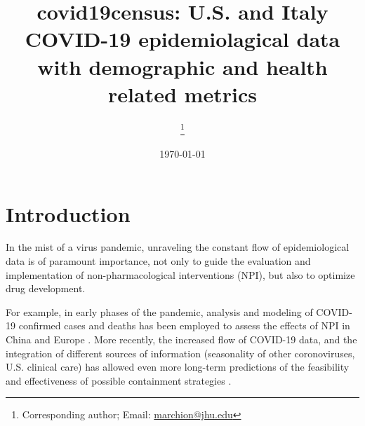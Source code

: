 \documentclass[12pt,halfline,a4paper,]{ouparticle}
\begin{document}
\title{covid19census: U.S. and Italy COVID-19 epidemiolagical data with
demographic and health related metrics}

\author{%
\address{Department of Oncology, Johns Hopkins University School of Medicine,
Baltimore, MD, USA}
\and
{}\address{Department of Oncology, Johns Hopkins University School of Medicine,
Baltimore, MD, USA}\thanks{Corresponding author; Email: \href{mailto:marchion@jhu.edu}{marchion@jhu.edu}}
\and
{}\address{Another University}
}


\date{\today}


\maketitle



\hypertarget{introduction}{%
\section{Introduction}\label{introduction}}

In the mist of a virus pandemic, unraveling the constant flow of
epidemiological data is of paramount importance, not only to guide the
evaluation and implementation of non-pharmacological interventions
(NPI), but also to optimize drug development.

For example, in early phases of the pandemic, analysis and modeling of
COVID-19 confirmed cases and deaths has been employed to assess the
effects of NPI in China and Europe \citep{flaxman2020, prem2020tlph}.
More recently, the increased flow of COVID-19 data, and the integration
of different sources of information (seasonality of other coronoviruses,
U.S. clinical care) has allowed even more long-term predictions of the
feasibility and effectiveness of possible containment strategies
\citep{kissler2020s}.
\end{document}

